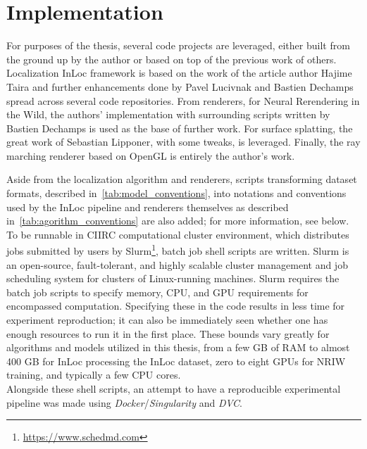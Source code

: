 \section{Implementation}

For purposes of the thesis, several code projects are leveraged, either built from the
ground up by the author or based on top of the previous work of others.  Localization
InLoc framework is based on the work of the article author Hajime Taira and further
enhancements done by Pavel Lucivnak and Bastien Dechamps spread across several code
repositories. From renderers, for Neural Rerendering in the Wild, the authors'
implementation with surrounding scripts written by Bastien Dechamps is used as the base of
further work. For surface splatting, the great work of Sebastian Lipponer, with some
tweaks, is leveraged. Finally, the ray marching renderer based on OpenGL is entirely the
author's work.

Aside from the localization algorithm and renderers, scripts transforming dataset formats,
described in~\cref{tab:model_conventions}, into notations and conventions used by the InLoc
pipeline and renderers themselves as described in~\cref{tab:agorithm_conventions}
are also added; for more information, see below.\\

To be runnable in CIIRC computational cluster environment, which distributes jobs
submitted by users by Slurm\footnote{\url{https://www.schedmd.com}}, batch job shell
scripts are written. Slurm is an open-source, fault-tolerant, and highly scalable cluster
management and job scheduling system for clusters of Linux-running machines. Slurm
requires the batch job scripts to specify memory, CPU, and GPU requirements for
encompassed computation. Specifying these in the code results in less time for experiment
reproduction; it can also be immediately seen whether one has enough resources to run it
in the first place. These bounds vary greatly for algorithms and models utilized in this
thesis, from a few GB of RAM to almost 400 GB for InLoc processing the InLoc dataset, zero
to eight GPUs for NRIW training, and typically a few CPU cores.\\

Alongside these shell scripts, an attempt to have a reproducible experimental pipeline was
made using \emph{Docker}/\emph{Singularity} and \emph{DVC}.

